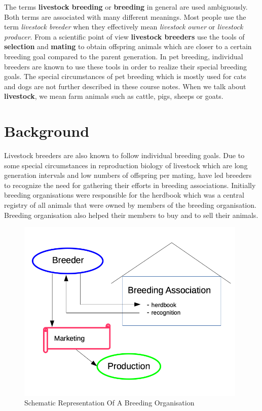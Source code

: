 \documentclass[
]{book}
\begin{document}
The terms \textbf{livestock breeding} or \textbf{breeding} in general are used ambiguously. Both terms are associated with many different meanings. Most people use the term \emph{livestock breeder} when they effectively mean \emph{livestock owner} or \emph{livestock producer}. From a scientific point of view \textbf{livestock breeders} use the tools of \textbf{selection} and \textbf{mating} to obtain offspring animals which are closer to a certain breeding goal compared to the parent generation. In pet breeding, individual breeders are known to use these tools in order to realize their special breeding goals. The special circumstances of pet breeding which is mostly used for cats and dogs are not further described in these course notes. When we talk about \textbf{livestock}, we mean farm animals such as cattle, pigs, sheeps or goats.

\hypertarget{gel-intro-background}{%
\section{Background}\label{gel-intro-background}}

Livestock breeders are also known to follow individual breeding goals. Due to some special circumstances in reproduction biology of livestock which are long generation intervals and low numbers of offspring per mating, have led breeders to recognize the need for gathering their efforts in breeding associations. Initially breeding organisations were responsible for the herdbook which was a central registry of all animals that were owned by members of the breeding organisation. Breeding organisation also helped their members to buy and to sell their animals.

\begin{figure}[H]
\includegraphics[width=11cm]{odg/breedingassociation} \caption{Schematic Representation Of A Breeding Organisation}\label{fig:breedingassociation}
\end{figure}
\end{document}
